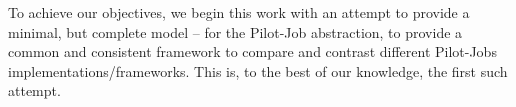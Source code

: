 \documentclass[conference,final]{IEEEtran}
\newcommand{\jhanote}[1]{ {\textcolor{red} { ***shantenu: #1 }}}
\newcommand{\jhanote}[1]{}
\begin{document}

      





To achieve our objectives, we begin this work with an attempt to
provide a minimal, but complete model -- for the Pilot-Job
abstraction, to provide a common and consistent framework to compare
and contrast different Pilot-Jobs implementations/frameworks. This is,
to the best of our knowledge, the first such attempt.
\end{document}
